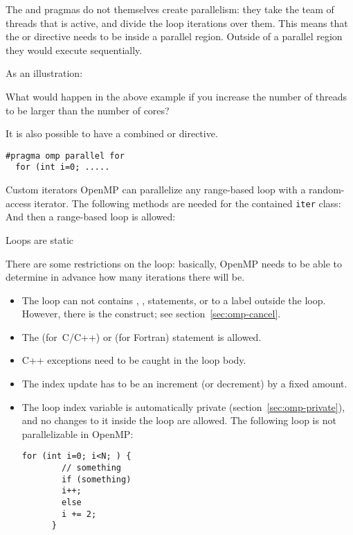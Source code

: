 The  and 
pragmas do not themselves create parallelism:
they take the team of threads that is active,
and divide the loop iterations over them.
This means that the  or  directive needs to be
inside a parallel region.
Outside of a parallel region they would execute sequentially.

As an illustration:
\begingroup \def\snippetcodefraction{.52} \def\snippetlistfraction{.48} %
\endgroup %

\begin{exercise}
  What would happen in the above example if you increase the number of threads
  to be larger than the number of cores?
\end{exercise}

It is also possible to have a combined
 or  directive.
\begin{lstlisting}[language=omp]
#pragma omp parallel for
  for (int i=0; .....
\end{lstlisting}

\begin{cppnote}{Custom iterators}
  OpenMP can parallelize any range-based loop with a random-access iterator.
  The following methods are needed for the contained \lstinline{iter} class:
  And then a range-based loop is allowed:
\end{cppnote}

 {Loops are static}

There are some restrictions on the loop: basically, OpenMP needs to be
able to determine in advance how many iterations there will be.
\begin{itemize}
\item The loop can not contains , ,  statements, or
   to a label outside the loop.
  However, there is the  construct;
  see section~\ref{sec:omp-cancel}.
\item The  (for~C/C++)
  or  (for Fortran)
  statement is allowed.
\item C++ exceptions need to be caught in the loop body.
\item The index update has to be an increment (or decrement) by a fixed amount.
\item The loop index variable is automatically private (section~\ref{sec:omp-private}),
  and no changes to it
  inside the loop are allowed.
  The following loop is not parallelizable in OpenMP:
    \begin{lstlisting}[language=omp]
      for (int i=0; i<N; ) {
        // something
        if (something)
        i++;
        else
        i += 2;
      }
    \end{lstlisting}
\end{itemize}

